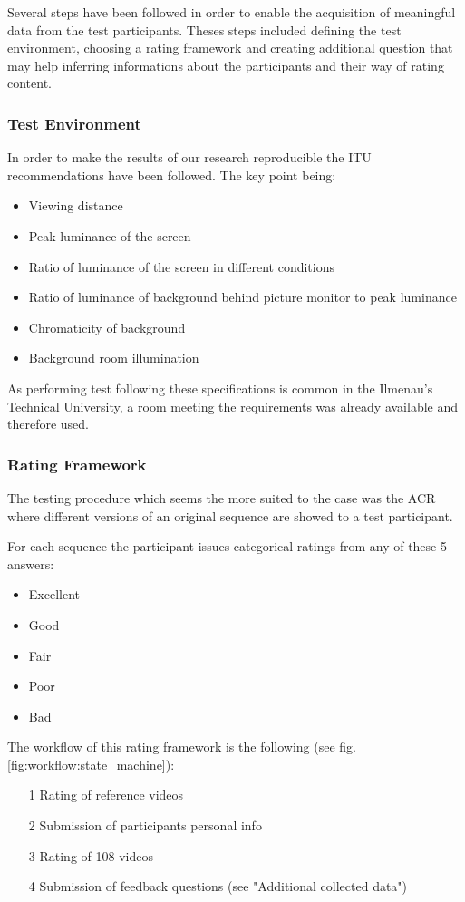 Several steps have been followed in order to enable the acquisition of meaningful data from the test participants. Theses steps included defining the test environment, choosing a rating framework and creating additional question that may help inferring informations about the participants and their way of rating content.

\subsubsection{Test Environment}
In order to make the results of our research reproducible the ITU recommendations \cite{rec1998p} have been followed. 
The key point being:
\begin{itemize}
	\item Viewing distance
	\item Peak luminance of the screen
	\item Ratio of luminance of the screen in different conditions
	\item Ratio of luminance of background behind picture monitor to peak luminance
	\item Chromaticity of background
	\item Background room illumination
\end{itemize}

As performing test following these specifications is common in the Ilmenau's Technical University, a room meeting the requirements was already available and therefore used.

	
\subsubsection{Rating Framework}
The testing procedure which seems the more suited to the case was the ACR \cite{rec1998p} where different versions of an original sequence are showed to a test participant. 

For each sequence the participant issues categorical ratings from any of these 5 answers: 
\begin{itemize}
	\item Excellent
	\item Good
	\item Fair
	\item Poor
	\item Bad
\end{itemize}


The workflow of this rating framework is the following (see fig. \ref{fig:workflow:state_machine}):
\begin{enumerate}
	\item[1] Rating of reference videos
	\item[2] Submission of participants personal info
	\item[3] Rating of 108 videos
	\item[4] Submission of feedback questions (see "Additional collected data")
\end{enumerate}

